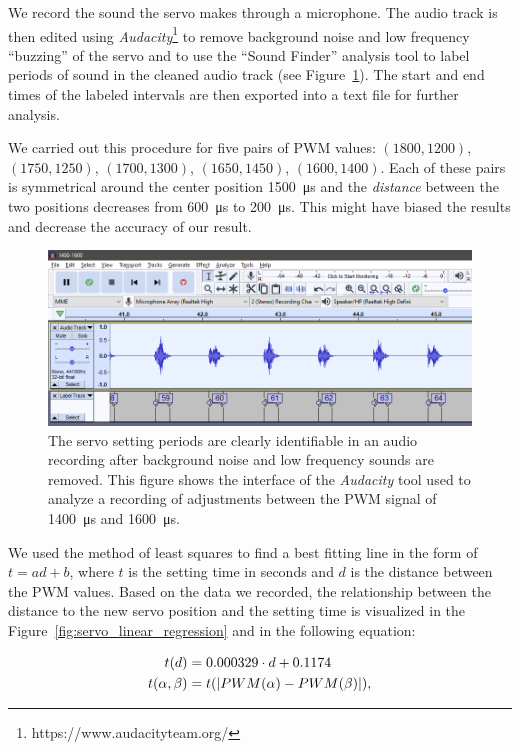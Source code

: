 We record the sound the servo makes through a microphone. The audio track is then edited using \textit{Audacity}\footnote{https://www.audacityteam.org/} to remove background noise and low frequency ``buzzing'' of the servo and to use the ``Sound Finder'' analysis tool to label periods of sound in the cleaned audio track (see Figure~\ref{fig:audacity}). The start and end times of the labeled intervals are then exported into a text file for further analysis.

We carried out this procedure for five pairs of \gls*{PWM} values: $(1800, 1200)$, $(1750, 1250)$, $(1700, 1300)$, $(1650, 1450)$, $(1600, 1400)$. Each of these pairs is symmetrical around the center position \SI{1500}{\micro\second} and the \textit{distance} between the two positions decreases from \SI{600}{\micro\second} to \SI{200}{\micro\second}. This might have biased the results and decrease the accuracy of our result.

\begin{figure}
	\includegraphics[width=\textwidth]{../img/servo_experiment_audacity}
	\protect\caption{The servo setting periods are clearly identifiable in an audio recording after background noise and low frequency sounds are removed. This figure shows the interface of the \textit{Audacity} tool used to analyze a recording of adjustments between the PWM signal of \SI{1400}{\micro\second} and \SI{1600}{\micro\second}.}
	\label{fig:audacity}
\end{figure}

We used the method of least squares to find a best fitting line in the form of $t=ad+b$, where $t$ is the setting time in seconds and $d$ is the distance between the \gls*{PWM} values. Based on the data we recorded, the relationship between the distance to the new servo position and the setting time is visualized in the Figure~\ref{fig:servo_linear_regression} and in the following equation:

\begin{equation}
\label{eq:servo_setting_time}
\begin{aligned}
t(d)&=0.000329\cdot d + 0.1174\\
t(\alpha,\beta)&=t(\left|{PWM(\alpha)-PWM(\beta)}\right|),
\end{aligned}
\end{equation}

